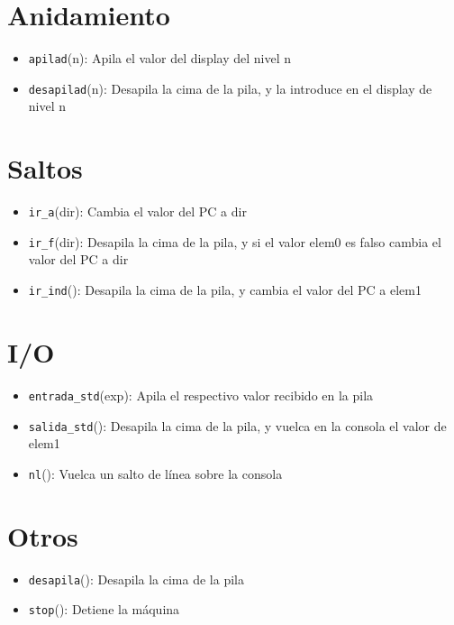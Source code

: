 \section{Anidamiento}

\begin{itemize}
    \item \texttt{apilad}(n): Apila el valor del display del nivel n
    \item \texttt{desapilad}(n): Desapila la cima de la pila, y la introduce en el display de nivel n
\end{itemize}

\section{Saltos}

\begin{itemize}
    \item \texttt{ir\_a}(dir): Cambia el valor del PC a dir
    \item \texttt{ir\_f}(dir): Desapila la cima de la pila, y si el valor elem0 es falso cambia el valor del PC a dir
    \item \texttt{ir\_ind}(): Desapila la cima de la pila, y cambia el valor del PC a elem1
\end{itemize}

\section{I/O}

\begin{itemize}
    \item \texttt{entrada\_std}(exp): Apila el respectivo valor recibido en la pila
    \item \texttt{salida\_std}(): Desapila la cima de la pila, y vuelca en la consola el valor de elem1
    \item \texttt{nl}(): Vuelca un salto de línea sobre la consola
\end{itemize}

\section{Otros}

\begin{itemize}
    \item \texttt{desapila}(): Desapila la cima de la pila
    \item \texttt{stop}(): Detiene la máquina
\end{itemize}